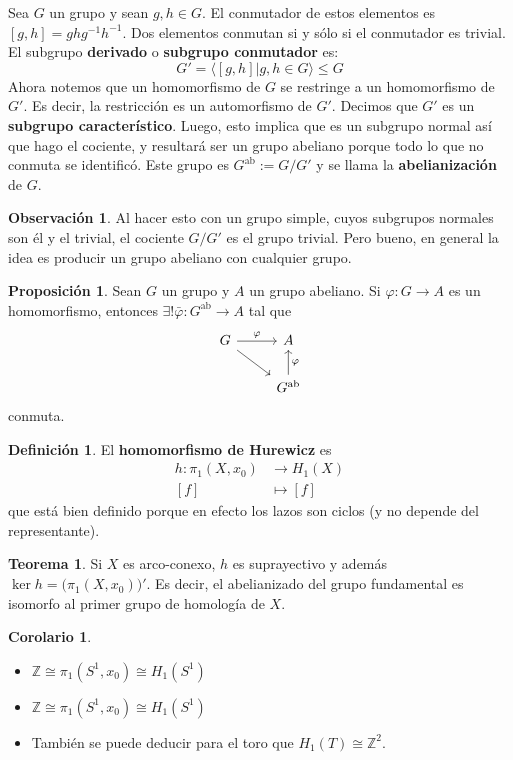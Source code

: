 \documentclass[spanish]{book}
\theoremstyle{definition}
\newtheorem*{defn}{Definición}
\newtheorem*{obs}{Observación}
\newtheorem*{teo}{Teorema}
\newtheorem*{prop}{Proposición}
\newtheorem*{coro}{Corolario}
\newcommand{\Z}{\mathbb{Z}}
\begin{document}
Sea $G$ un grupo y sean $g,h\in G$. El conmutador de estos elementos es $[g,h]=ghg^{-1}h^{-1}$. Dos elementos conmutan si y sólo si el conmutador es trivial. El subgrupo \textbf{derivado} o \textbf{subgrupo conmutador} es:
\[G'=\langle[g,h]|g,h\in G\rangle\leq G\]
Ahora notemos que un homomorfismo de $G$ se restringe a un homomorfismo de $G'$. Es decir, la restricción es un automorfismo de $G'$. Decimos que $G'$ es un \textbf{subgrupo característico}. Luego, esto implica que es un subgrupo normal así que hago el cociente, y resultará ser un grupo abeliano porque todo lo que no conmuta se identificó. Este grupo es $G^{\text{ab}}:=G/G'$ y se llama la \textbf{abelianización }de $G$.
\begin{obs}
	Al hacer esto con un grupo simple, cuyos subgrupos normales son él y el trivial, el cociente $G/G'$ es el grupo trivial. Pero bueno, en general la idea es producir un grupo abeliano con cualquier grupo.
\end{obs}
\begin{prop}
	Sean $G$ un grupo y $A$ un grupo abeliano. Si $\varphi:G\to A$ es un homomorfismo, entonces $\exists! \bar\varphi:G^\text{ab}\to A$ tal que 
	\[
	\begin{tikzcd}
		G \arrow[r, "\varphi"] \arrow[dr] & A \\
		& G^{\text{ab}} \arrow[u, swap, "\varphi"]
	\end{tikzcd}
	\]
	conmuta.
\end{prop}
\begin{defn}
	El \textbf{homomorfismo de Hurewicz} es
	\begin{align*}
		h:\pi_1(X,x_0)&\to H_1(X)\\
		[f]&\mapsto [f]
	\end{align*}
	que está bien definido porque en efecto los lazos son ciclos (y no depende del representante).
\end{defn}
\begin{teo}
	Si $X$ es arco-conexo, $h$ es suprayectivo y además $\ker h=\big(\pi_1(X,x_0)\big)'$. Es decir, el abelianizado del grupo fundamental es isomorfo al primer grupo de homología de $X$.
\end{teo}
\begin{coro}\leavevmode
	\begin{itemize}
		\item $\Z\cong\pi_1(S^1,x_0)\cong H_1(S^1)$
		\item $\Z\cong\pi_1(S^1,x_0)\cong H_1(S^1)$
		\item También se puede deducir para el toro que $H_1(T)\cong \Z^2$.
	\end{itemize}
\end{coro}
\end{document}
